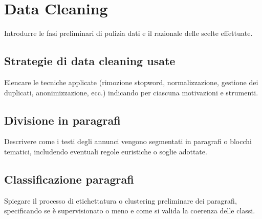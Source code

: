 \chapter{Data Cleaning}
Introdurre le fasi preliminari di pulizia dati e il razionale delle scelte effettuate.

\section{Strategie di data cleaning usate}
Elencare le tecniche applicate (rimozione stopword, normalizzazione, gestione dei duplicati, anonimizzazione, ecc.) indicando per ciascuna motivazioni e strumenti.

\section{Divisione in paragrafi}
Descrivere come i testi degli annunci vengono segmentati in paragrafi o blocchi tematici, includendo eventuali regole euristiche o soglie adottate.

\section{Classificazione paragrafi}
Spiegare il processo di etichettatura o clustering preliminare dei paragrafi, specificando se è supervisionato o meno e come si valida la coerenza delle classi.

